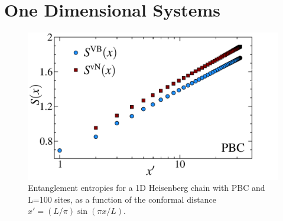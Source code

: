 \section{One Dimensional Systems}

\begin{figure} {
\includegraphics[width=5.5in]{./figures/paper1/figure1/thesis_pbc.pdf} 
\centering
\caption[1D PBC Results for \vb with \vN]{
Entanglement entropies for a 1D Heisenberg chain with PBC and L=100 sites, as a function of the conformal distance $x'  = (L/\pi)\sin (\pi x/L)$.
\label{1dPBC}}
} 
\end{figure}

